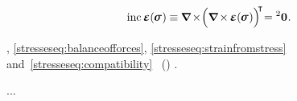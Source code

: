 \nopagebreak\vspace{-0.5em}
\begin{equation}\label{stresseseq:compatibility}
\operatorname{inc} \infinitesimaldeformation(\hspace{-0.15ex}\linearstress\hspace{.1ex}) \hspace{-0.06ex}
\equiv
\hspace{-0.07ex} \boldnabla \hspace{-0.2ex} \times \hspace{-0.44ex} \Bigl( \boldnabla \hspace{-0.2ex} \times \hspace{-0.16ex} \infinitesimaldeformation(\hspace{-0.15ex}\linearstress\hspace{.1ex}) \Bigr)^{\raisemath{-0.12em}{\hspace{-0.44ex}\T}} \hspace{-0.52ex}
= {^2\bm{0}}
\hspace{.1ex} .
\end{equation}

\vspace{-0.3em}\noindent
{}, \eqref{stresseseq:balanceofforces}, \eqref{stresseseq:strainfromstress} and~\eqref{stresseseq:compatibility}  ~()  .

...
